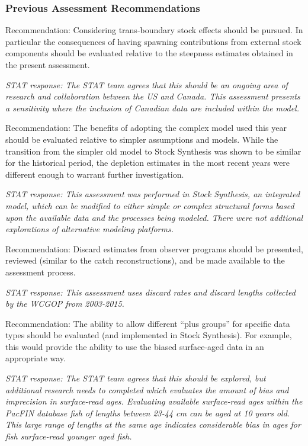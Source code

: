 \documentclass[12pt,]{article}
\begin{document}
\subsubsection{Previous Assessment
Recommendations}\label{previous-assessment-recommendations}

Recommendation: Considering trans-boundary stock effects should be
pursued. In particular the consequences of having spawning contributions
from external stock components should be evaluated relative to the
steepness estimates obtained in the present assessment.

\emph{STAT response: The STAT team agrees that this should be an ongoing
area of research and collaboration between the US and Canada. This
assessment presents a sensitivity where the inclusion of Canadian data
are included within the model.}

Recommendation: The benefits of adopting the complex model used this
year should be evaluated relative to simpler assumptions and models.
While the transition from the simpler old model to Stock Synthesis was
shown to be similar for the historical period, the depletion estimates
in the most recent years were different enough to warrant further
investigation.

\emph{STAT response: This assessment was performed in Stock Synthesis,
an integrated model, which can be modified to either simple or complex
structural forms based upon the available data and the processes being
modeled. There were not addtional explorations of alternative modeling
platforms.}

Recommendation: Discard estimates from observer programs should be
presented, reviewed (similar to the catch reconstructions), and be made
available to the assessment process.

\emph{STAT response: This assessment uses discard rates and discard
lengths collected by the WCGOP from 2003-2015.}

Recommendation: The ability to allow different ``plus groups'' for
specific data types should be evaluated (and implemented in Stock
Synthesis). For example, this would provide the ability to use the
biased surface-aged data in an appropriate way.

\emph{STAT response: The STAT team agrees that this should be explored,
but additional research needs to completed which evaluates the amount of
bias and imprecision in surface-read ages. Evaluating available
surface-read ages within the PacFIN database fish of lengths between
23-44 cm can be aged at 10 years old. This large range of lengths at the
same age indicates considerable bias in ages for fish surface-read
younger aged fish.}
\end{document}
